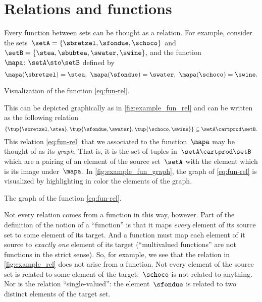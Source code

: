 

\section{Relations and functions}


Every function between sets can be thought as a relation.
For example, consider the sets~$\setA = \{ \sbretzel, \sfondue, \schoco \}$ and~$\setB = \{ \stea, \sbubtea, \swater, \swine \}$, and the function~$\mapa \colon \setA \sto \setB$ defined by
\begin{equation}
    \mapa (\sbretzel) = \stea, \ \mapa (\sfondue) = \swater, \ \mapa(\schoco) = \swine.
\end{equation}
\begin{marginfigure}
    \centering
    \caption{Visualization of the function \cref{eq:fun-rel}.}
    \label{fig:example_fun_rel}
\end{marginfigure}
This can be depicted graphically as in \cref{fig:example_fun_rel} and can be written as the following relation
\begin{equation}
    \label{eq:fun-rel}
    \{ \tup{\sbretzel, \stea}, \tup{\sfondue, \swater}, \tup{\schoco, \swine} \} \subseteq \setA \cartprod \setB.
\end{equation}
This relation \cref{eq:fun-rel} that we associated to the function~$\mapa$ may be thought of as its \emph{graph}.
That is, it is the set of tuples in~$\setA \cartprod \setB$ which are a pairing of an element of the source set~$\setA$ with the element which is its image under~$\mapa$.
In \cref{fig:example_fun_graph}, the graph of \cref{eq:fun-rel} is visualized by highlighting in color the elements of the graph.
\begin{marginfigure}
    \centering
    \caption{The graph of the function \cref{eq:fun-rel}.}
    \label{fig:example_fun_graph}
\end{marginfigure}

Not every relation comes from a function in this way, however.
Part of the definition of the notion of a ``function'' is that it maps \emph{every} element of its source set to some element of its target.
And a function must map each element of it source to \emph{exactly one} element of its target (``multivalued functions'' are not functions in the strict sense).
So, for example, we see that the relation in \cref{fig:example_rel} does not arise from a function.
Not every element of the source set is related to some element of the target:~$\schoco$ is not related to anything.
Nor is the relation ``single-valued'': the element~$\sfondue$ is related to two distinct elements of the target set.

